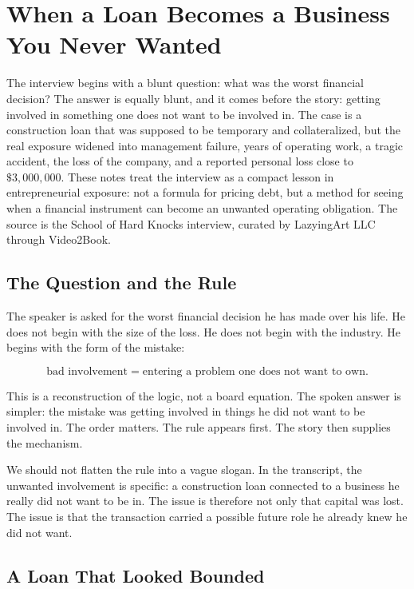\chapter{When a Loan Becomes a Business You Never Wanted}

The interview begins with a blunt question: what was the worst financial decision? The answer is equally blunt, and it comes before the story: getting involved in something one does not want to be involved in. The case is a construction loan that was supposed to be temporary and collateralized, but the real exposure widened into management failure, years of operating work, a tragic accident, the loss of the company, and a reported personal loss close to \(\$3{,}000{,}000\). These notes treat the interview as a compact lesson in entrepreneurial exposure: not a formula for pricing debt, but a method for seeing when a financial instrument can become an unwanted operating obligation. The source is the School of Hard Knocks interview, curated by LazyingArt LLC through Video2Book.

\section{The Question and the Rule}

The speaker is asked for the worst financial decision he has made over his life. He does not begin with the size of the loss. He does not begin with the industry. He begins with the form of the mistake:

\begin{equation}
\text{bad involvement}
=
\text{entering a problem one does not want to own}.
\end{equation}

This is a reconstruction of the logic, not a board equation. The spoken answer is simpler: the mistake was getting involved in things he did not want to be involved in. The order matters. The rule appears first. The story then supplies the mechanism.

We should not flatten the rule into a vague slogan. In the transcript, the unwanted involvement is specific: a construction loan connected to a business he really did not want to be in. The issue is therefore not only that capital was lost. The issue is that the transaction carried a possible future role he already knew he did not want.

\section{A Loan That Looked Bounded}

